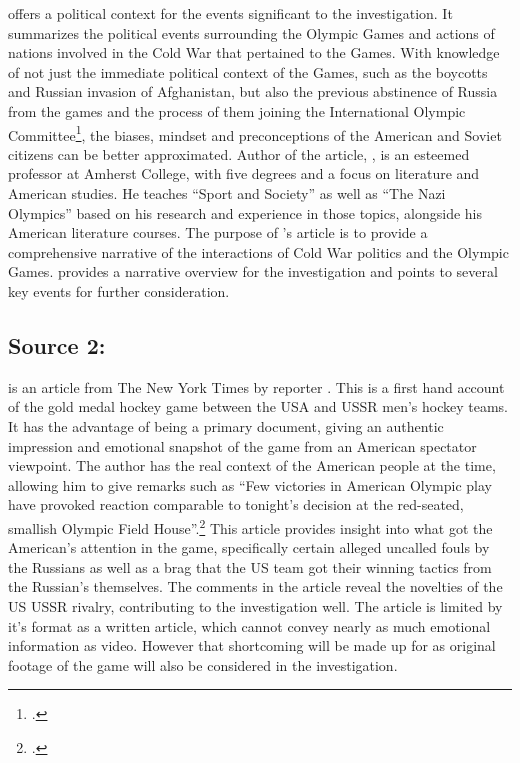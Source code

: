 \documentclass[12pt,letterpaper]{article}
\begin{document}
 offers a political context for the events significant to the investigation. It summarizes the political events surrounding the Olympic Games and actions of nations involved in the Cold War that pertained to the Games. With knowledge of not just the immediate political context of the Games, such as the boycotts and Russian invasion of Afghanistan, but also the previous abstinence of Russia from the games and the process of them joining the International Olympic Committee\footcite[555-558]{guttmann_cold_1988}, the biases, mindset and preconceptions of the American and Soviet citizens can be better approximated. Author of the article, \citeauthor{guttmann_cold_1988}, is an esteemed professor at Amherst College, with five degrees and a focus on literature and American studies. He teaches ``Sport and Society'' as well as ``The Nazi Olympics'' based on his research and experience in those topics, alongside his American literature courses. The purpose of \citeauthor{guttmann_cold_1988}'s article is to provide a comprehensive narrative of the interactions of Cold War politics and the Olympic Games.  provides a narrative overview for the investigation and points to several key events for further consideration. 

\subsection{Source 2: }

 is an article from The New York Times by reporter \citeauthor{eskenazi_u.s._1980}. This is a first hand account of the gold medal hockey game between the USA and USSR men's hockey teams. It has the advantage of being a primary document, giving an authentic impression and emotional snapshot of the game from an American spectator viewpoint. The author has the real context of the American people at the time, allowing him to give remarks such as ``Few victories in American Olympic play have provoked reaction comparable to tonight's decision at the red-seated, smallish Olympic Field House''.\footcite{eskenazi_u.s._1980} This article provides insight into what got the American's attention in the game, specifically certain alleged uncalled fouls by the Russians as well as a brag that the US team got their winning tactics from the Russian's themselves. The comments in the article reveal the novelties of the US USSR rivalry, contributing to the investigation well. The article is limited by it's format as a written article, which cannot convey nearly as much emotional information as video. However that shortcoming will be made up for as original footage of the game will also be considered in the investigation. 
\end{document}

